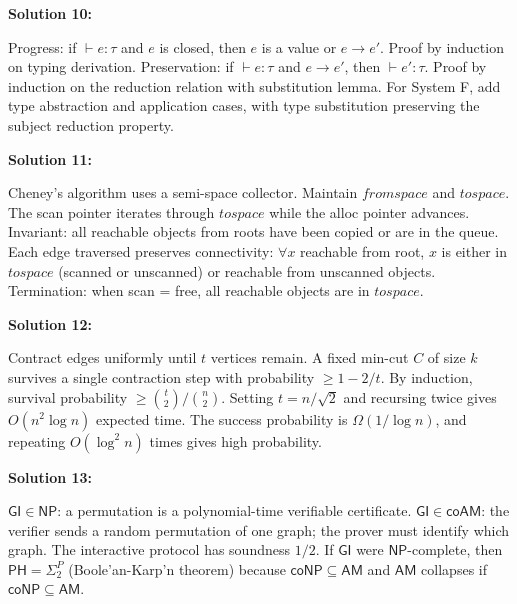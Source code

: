 \documentclass[12pt,a4paper]{exam}
\begin{document}
\vspace{0.5cm}

\textbf{Solution 10:}

Progress: if $\vdash e: \tau$ and $e$ is closed, then $e$ is a value or $e \to e'$. Proof by induction on typing derivation. Preservation: if $\vdash e: \tau$ and $e \to e'$, then $\vdash e': \tau$. Proof by induction on the reduction relation with substitution lemma. For System F, add type abstraction and application cases, with type substitution preserving the subject reduction property.

\vspace{0.5cm}

\textbf{Solution 11:}

Cheney's algorithm uses a semi-space collector. Maintain $fromspace$ and $tospace$. The scan pointer iterates through $tospace$ while the alloc pointer advances. Invariant: all reachable objects from roots have been copied or are in the queue. Each edge traversed preserves connectivity: $\forall x$ reachable from root, $x$ is either in $tospace$ (scanned or unscanned) or reachable from unscanned objects. Termination: when scan = free, all reachable objects are in $tospace$.

\vspace{0.5cm}

\textbf{Solution 12:}

Contract edges uniformly until $t$ vertices remain. A fixed min-cut $C$ of size $k$ survives a single contraction step with probability $\geq 1 - 2/t$. By induction, survival probability $\geq \binom{t}{2}/\binom{n}{2}$. Setting $t = n/\sqrt{2}$ and recursing twice gives $O(n^2 \log n)$ expected time. The success probability is $\Omega(1/\log n)$, and repeating $O(\log^2 n)$ times gives high probability.

\vspace{0.5cm}

\textbf{Solution 13:}

$\mathsf{GI} \in \mathsf{NP}$: a permutation is a polynomial-time verifiable certificate. $\mathsf{GI} \in \mathsf{coAM}$: the verifier sends a random permutation of one graph; the prover must identify which graph. The interactive protocol has soundness $1/2$. If $\mathsf{GI}$ were $\mathsf{NP}$-complete, then $\mathsf{PH} = \Sigma_2^P$ (Boole'an-Karp'n theorem) because $\mathsf{coNP} \subseteq \mathsf{AM}$ and $\mathsf{AM}$ collapses if $\mathsf{coNP} \subseteq \mathsf{AM}$.

\vspace{0.5cm}
\end{document}
